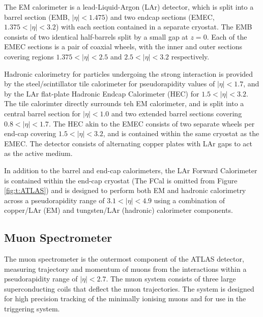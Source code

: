 		The EM calorimeter is a lead-Liquid-Argon (LAr) detector, which is split into a barrel section (EMB, $|\eta|<1.475$) and two endcap sections (EMEC, $1.375<|\eta|<3.2$) with each section contained in a separate cryostat. The EMB consists of two identical half-barrels split by a small gap at $z=0$. Each of the EMEC sections is a pair of coaxial wheels, with the inner and outer sections covering regions $1.375<|\eta|<2.5$ and $2.5<|\eta|<3.2$ respectively.
		
		Hadronic calorimetry for particles undergoing the strong interaction is provided by the steel/scintillator tile calorimeter for pseudorapidity values of $|\eta|<1.7$, and by the LAr flat-plate Hadronic Endcap Calorimeter (HEC) for $1.5<|\eta|<3.2$. The tile calorimter directly surrounds teh EM calorimeter, and is split into a central barrel section for $|\eta| < 1.0$ and two extended barrel sections covering $0.8<|\eta|<1.7$. The HEC akin to the EMEC consists of two separate wheels per end-cap covering $1.5<|\eta|<3.2$, and is contained within the same cryostat as the EMEC. The detector consists of alternating copper plates with LAr gaps to act as the active medium. 
		
		In addition to the barrel and end-cap calorimeters, the LAr Forward Calorimeter is contained within the end-cap cryostat (The FCal is omitted from Figure \ref{fig:t:ATLAS}) and is designed to perform both EM and hadronic calorimetry across a pseudorapidity range of $3.1<|\eta|<4.9$ using a combination of copper/LAr (EM) and tungsten/LAr (hadronic) calorimeter components. 
		
	\subsection{Muon Spectrometer}
	
		The muon spectrometer is the outermost component of the ATLAS detector, measuring trajectory and momentum of muons from the interactions within a pseudorapidity range of $|\eta| < 2.7$. The muon system consists of three large superconducting coils that deflect the muon trajectories. The system is designed for high precision tracking of the minimally ionising muons and for use in the triggering system.
	
